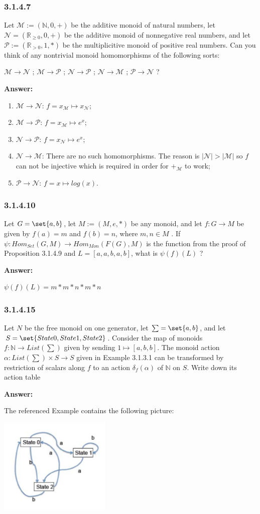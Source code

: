 \documentclass{article}
\newcommand{\N}{\mathbb{N}}
\newcommand{\Rat}{\mathbb{R}}
\newcommand{\vsp}[0]{\vspace*{10pt}\par}
\newcommand{\exercise}[1]{\subsubsection*{#1}}
\newcommand{\ans}[0]{\vsp\textbf{Answer: }\vsp}
\newcommand{\ei}{\item}
\newcommand{\es}{\begin{enumerate}[label=(\alph*)]\ei}
\newcommand{\ee}{\end{enumerate}}
\begin{document}
\exercise{3.1.4.7}

Let $\mathcal{M} := (\N, 0, +)$ be the additive monoid of natural numbers, let
$\mathcal{N} = (\Rat_{\ge 0} , 0, +)$ be the additive monoid of nonnegative real
numbers, and let $\mathcal{P} := (\Rat_{>0} , 1, *)$ be the multiplicitive
monoid of positive real numbers. Can you think of any nontrivial monoid
homomorphisms of the following sorts:

$\mathcal{M} \to \mathcal{N}$ ;
$\mathcal{M} \to \mathcal{P}$ ;
$\mathcal{N} \to \mathcal{P}$ ;
$\mathcal{N} \to \mathcal{M}$ ;
$\mathcal{P} \to \mathcal{N}$ ?

\ans

\es $\mathcal{M} \to \mathcal{N}$: $f = x_{\mathcal{M}} \mapsto x_{\mathcal{N}}$;
\ei $\mathcal{M} \to \mathcal{P}$: $f = x_{\mathcal{M}} \mapsto e^x$;
\ei $\mathcal{N} \to \mathcal{P}$: $f = x_{\mathcal{N}} \mapsto e^x$;
\ei $\mathcal{N} \to \mathcal{M}$: There are no such homomorphisms. The reason
    is $|\mathcal{N}| > |\mathcal{M}|$ so $f$ can not be injective which is
    required in order for $+_{\mathcal{M}}$ to work;
\ei $\mathcal{P} \to \mathcal{N}$: $f = x \mapsto log(x)$.
\ee

\exercise{3.1.4.10}

Let $G = \set{a,b}$, let $M := (M, e, *)$ be any monoid, and let $f : G \to M$
be given by $f(a) = m$ and $f(b) = n$, where $m, n \in M$ . If $\psi :
Hom_{Set}(G, M) \to Hom_{Mon}(F(G), M)$ is the function from the proof of
Proposition 3.1.4.9 and $L = [a, a, b, a, b]$, what is $\psi(f)(L)$ ?

\ans

$\psi(f)(L) = m * m * n * m * n$

\exercise{3.1.4.15}

Let $N$ be the free monoid on one generator, let $\sum = \set{a, b}$, and let $S
= \set{State 0, State 1, State 2}$. Consider the map of monoids $f : \N \to
List(\sum)$ given by sending $1 \mapsto [a, b, b]$. The monoid action $\alpha :
List(\sum) \times S \to S$ given in Example 3.1.3.1 can be transformed by
restriction of scalars along $f$ to an action $\delta_f(\alpha)$ of $\N$ on
$S$. Write down its action table

\ans

The referenced Example contains the following picture:

\begin{center}
\includegraphics[width=0.4\textwidth]{img/finite-state-machine.png}
\end{center}
\end{document}
